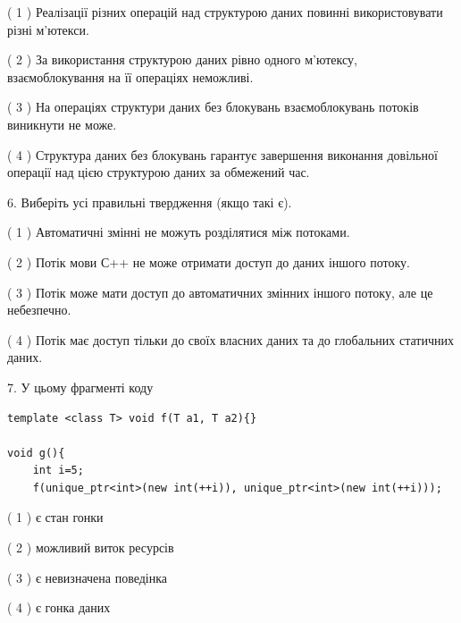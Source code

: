 \documentclass[12pt, ukrainian]{article}
\begin{document}
\begin {large}
{( 1 ) Реалізації різних операцій над структурою даних повинні використовувати різні м’ютекси.%

( 2 ) За використання структурою даних рівно одного м’ютексу, взаємоблокування на її операціях неможливі.%

( 3 ) На операціях структури даних без блокувань взаємоблокувань потоків виникнути не може.%

( 4 ) Структура даних без блокувань гарантує завершення виконання довільної операції над цією структурою даних за обмежений час.%
\newpage



\vspace{5mm}
6. Виберіть усі правильні твердження (якщо такі є).\par
\vspace{2mm}

( 1 ) Автоматичні змінні не можуть розділятися між потоками.%

( 2 ) Потік мови С++ не може отримати доступ до даних іншого потоку.%

( 3 ) Потік може мати доступ до автоматичних змінних іншого потоку, але це небезпечно.%

( 4 ) Потік має доступ тільки до своїх власних даних та до глобальних статичних даних.%


\vspace{5mm}
7. У цьому фрагменті коду
\begin{verbatim}
template <class T> void f(T a1, T a2){}

void g(){
    int i=5;
    f(unique_ptr<int>(new int(++i)), unique_ptr<int>(new int(++i)));
\end{verbatim}

( 1 ) є стан гонки%

( 2 ) можливий виток ресурсів%

( 3 ) є невизначена поведінка%

( 4 ) є гонка даних%
}
\end {large}
\end{document}

